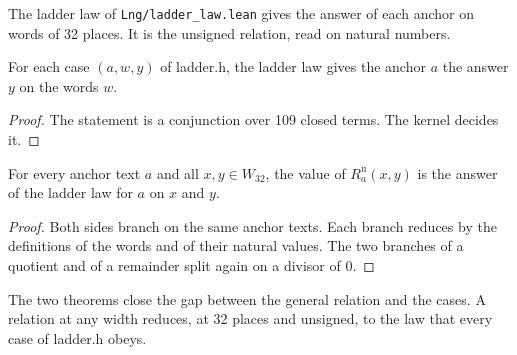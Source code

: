 The ladder law of \texttt{Lng/ladder\_law.lean} gives the answer of each anchor on words of 32 places. It is the
unsigned relation, read on natural numbers.

\begin{theorem}
For each case $(a, w, y)$ of ladder.h, the ladder law gives the anchor $a$ the answer $y$ on the words $w$.
\end{theorem}

\begin{proof}
The statement is a conjunction over 109 closed terms. The kernel decides it.
\end{proof}

\begin{theorem}
For every anchor text $a$ and all $x, y \in W_{32}$, the value of $R^{\mathrm{u}}_a(x, y)$ is the answer of the
ladder law for $a$ on $x$ and $y$.
\end{theorem}

\begin{proof}
Both sides branch on the same anchor texts. Each branch reduces by the definitions of the words and of their
natural values. The two branches of a quotient and of a remainder split again on a divisor of 0.
\end{proof}

The two theorems close the gap between the general relation and the cases. A relation at any width reduces, at
32 places and unsigned, to the law that every case of ladder.h obeys.
